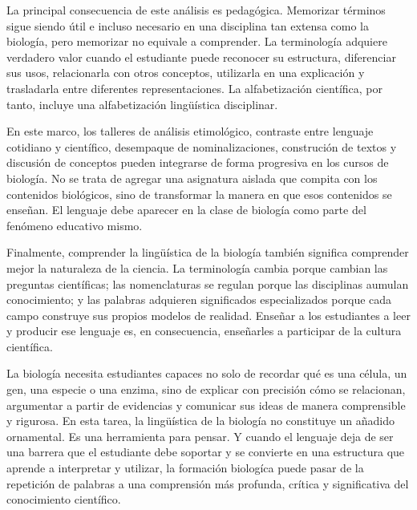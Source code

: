 \documentclass[12pt]{article}
\begin{document}
La principal consecuencia de este análisis es pedagógica. Memorizar términos sigue siendo útil e incluso necesario en una disciplina tan extensa como la biología, pero memorizar no equivale a comprender. La terminología adquiere verdadero valor cuando el estudiante puede reconocer su estructura, diferenciar sus usos, relacionarla con otros conceptos, utilizarla en una explicación y trasladarla entre diferentes representaciones. La alfabetización científica, por tanto, incluye una alfabetización lingüística disciplinar.

En este marco, los talleres de análisis etimológico, contraste entre lenguaje cotidiano y científico, desempaque de nominalizaciones, construción de textos y discusión de conceptos pueden integrarse de forma progresiva en los cursos de biología. No se trata de agregar una asignatura aislada que compita con los contenidos biológicos, sino de transformar la manera en que esos contenidos se enseñan. El lenguaje debe aparecer en la clase de biología como parte del fenómeno educativo mismo.

Finalmente, comprender la lingüística de la biología también significa comprender mejor la naturaleza de la ciencia. La terminología cambia porque cambian las preguntas científicas; las nomenclaturas se regulan porque las disciplinas aumulan conocimiento; y las palabras adquieren significados especializados porque cada campo construye sus propios modelos de realidad. Enseñar a los estudiantes a leer y producir ese lenguaje es, en consecuencia, enseñarles a participar de la cultura científica.

La biología necesita estudiantes capaces no solo de recordar qué es una célula, un gen, una especie o una enzima, sino de explicar con precisión cómo se relacionan, argumentar a partir de evidencias y comunicar sus ideas de manera comprensible y rigurosa. En esta tarea, la lingüística de la biología no constituye un añadido ornamental. Es una herramienta para pensar. Y cuando el lenguaje deja de ser una barrera que el estudiante debe soportar y se convierte en una estructura que aprende a interpretar y utilizar, la formación biologíca puede pasar de la repetición de palabras a una comprensión más profunda, crítica y significativa del conocimiento científico.
\end{document}
